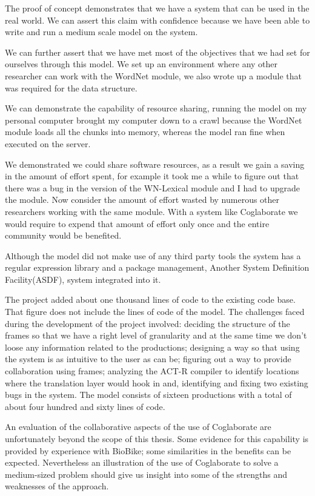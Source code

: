The proof of concept demonstrates that we have a system that can be
used in the real world. We can assert this claim with confidence
because we have been able to write and run a medium scale model on the
system. 

We can further assert that we have met most of the objectives that we
had set for ourselves through this model. We set up an environment
where any other researcher can work with the WordNet module, we also
wrote up a module that was required for the data structure. 

We can demonstrate the capability of resource sharing, running the
model on my personal computer brought my computer down to a crawl
because the WordNet module loads all the chunks into memory, whereas
the model ran fine when executed on the server.

We demonstrated we could share software resources, as a result we gain
a saving in the amount of effort spent, for example it took me a while
to figure out that there was a bug in the version of the
WN-Lexical module and I had to upgrade the module. Now consider
the amount of effort wasted by numerous other researchers working with
the same module. With a system like Coglaborate we would require to
expend that amount of effort only once and the entire community would
be benefited.

Although the model did not make use of any third party tools the
system has a regular expression library and a package management,
Another System Definition Facility(ASDF), system integrated into it.

The project added about one thousand lines of code to the existing
code base. That figure does not include the lines of code of the
model. The challenges faced during the development of the project
involved: deciding the structure of the frames so that we have a right
level of granularity and at the same time we don't loose any
information related to the productions; designing a way so that using
the system is as intuitive to the user as can be; figuring out a way
to provide collaboration using frames; analyzing the ACT-R compiler to
identify locations where the translation layer would hook in and,
identifying and fixing two existing bugs in the system. The model
consists of sixteen productions with a total of about four hundred and
sixty lines of code.

An evaluation of the collaborative aspects of the use of Coglaborate
are unfortunately beyond the scope of this thesis.  Some evidence for
this capability is provided by experience with BioBike; some
similarities in the benefits can be expected.  Nevertheless an
illustration of the use of Coglaborate to solve a medium-sized problem
should give us insight into some of the strengths and weaknesses of
the approach.









